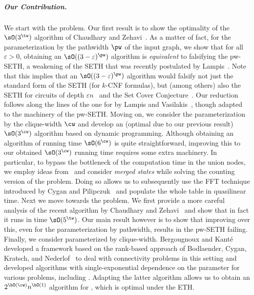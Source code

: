 \subparagraph{Our Contribution.}
We start with the {\InducedM} problem.
Our first result is to show the optimality of the $\sO(3^{\tw})$ algorithm of Chaudhary and Zehavi~\cite{wg/ChaudharyZ23a}.
As a matter of fact, for the parameterization by the pathwidth $\pw$ of the input graph,
we show that for all $\varepsilon>0$, obtaining an $\sO((3-\varepsilon)^{\pw})$ algorithm is \emph{equivalent} to
falsifying the pw-SETH, a weakening of the SETH that was recently postulated by Lampis~\cite{soda/Lampis25}.
Note that this implies that an $\sO((3-\varepsilon)^{\pw})$ algorithm would falsify not just the standard form of the SETH (for $k$-CNF formulas),
but (among others) also the SETH for circuits of depth $\varepsilon n$~\cite{arxiv/Lampis24} and the Set Cover Conjecture~\cite{CyganDLMNOPSW16}.
Our reduction follows along the lines of the one for {\BDD} by Lampis and Vasilakis~\cite{toct/LampisV24}, though adapted to the machinery of the pw-SETH.
Moving on, we consider the parameterization by the clique-width $\cw$ and develop an (optimal due to our previous result)
$\sO(3^{\cw})$ algorithm based on dynamic programming.
Although obtaining an algorithm of running time $\sO(6^{\cw})$ is quite straightforward,
improving this to our obtained $\sO(3^{\cw})$ running time requires some extra machinery.
In particular, to bypass the bottleneck of the computation time in the union nodes,
we employ ideas from~\cite{mfcs/BodlaenderLRV10,esa/RooijBR09} and consider \emph{merged states} while solving the
counting version of the problem.
Doing so allows us to subsequently use the FFT technique introduced by Cygan and Pilipczuk~\cite{tcs/CyganP10}
and populate the whole table in quasilinear time.
Next we move towards the {\AcyclicM} problem.
We first provide a more careful analysis of the recent algorithm by Chaudhary and Zehavi~\cite{wg/ChaudharyZ23a}
and show that in fact it runs in time $\sO(5^{\tw})$.
Our main result however is to show that improving over this, even for the parameterization by pathwidth,
results in the pw-SETH failing.
Finally, we consider {\AcyclicM} parameterized by clique-width.
Bergougnoux and Kant\'e~\cite{tcs/BergougnouxK19} developed a framework based on the rank-based approach of
Bodlaender, Cygan, Kratsch, and Nederlof~\cite{iandc/BodlaenderCKN15}
to deal with connectivity problems in this setting and developed algorithms with single-exponential dependence on the parameter
for various problems, including \FVS.
Adapting the latter algorithm allows us to obtain an $2^{\bO(\cw)} n^{\bO(1)}$ algorithm for \AcyclicM,
which is optimal under the ETH.


